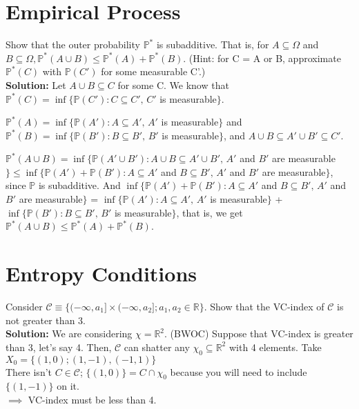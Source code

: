 \documentclass[11pt,letterpaper]{article}                  %
\begin{document}
\section{Empirical Process}

\begin{problem} Show that the outer probability $\mathbb{P}^*$ is subadditive. That is, for $A \subseteq \Omega$ and $B \subseteq \Omega, \mathbb{P}^*(A \cup B) \leq \mathbb{P}^*(A) + \mathbb{P}^*(B)$. (Hint: for C = A or B, approximate $\mathbb{P}^*(C)$ with $\mathbb{P}(C')$ for some measurable C'.) \\
	
	\textbf{Solution:}  Let $A \cup B \subseteq C$ for some C. We know that $\mathbb{P}^*(C) = \inf \{\mathbb{P}(C'): C \subseteq C', \, C'$ is measurable$\}$. 
	
	$\mathbb{P}^*(A) = \inf \{\mathbb{P}(A'): A \subseteq A', \, A'$ is measurable$\}$ and $\mathbb{P}^*(B) = \inf \{\mathbb{P}(B'): B \subseteq B', \, B'$ is measurable$\}$, and $A \cup B \subseteq A' \cup B' \subseteq C'$. 
	
	$\mathbb{P}^*(A \cup B) = \inf \{\mathbb{P}(A' \cup B'): A \cup B \subseteq A' \cup B', \, A'$ and $B'$ are measurable$\} \leq \inf \{\mathbb{P}(A') +  \mathbb{P}(B'): A \subseteq A'$ and $B \subseteq B', \, A'$ and $B'$ are measurable$\}$, since $\mathbb{P}$ is subadditive. And $\inf \{\mathbb{P}(A') +  \mathbb{P}(B'): A \subseteq A'$ and $B \subseteq B', \, A'$ and $B'$ are measurable$\}$ = $\inf \{\mathbb{P}(A'): A \subseteq A', \, A'$ is measurable$\}$ + $\inf \{\mathbb{P}(B'): B \subseteq B', \, B'$ is measurable$\}$, that is, we get $\mathbb{P}^*(A \cup B) \leq \mathbb{P}^*(A) + \mathbb{P}^*(B)$.
\end{problem}

\bigskip
\begin{problem}

\end{problem}

\bigskip
\section{Entropy Conditions}

\begin{problem} Consider $\mathcal{C}\equiv \{(-\infty, a_1] \times (-\infty, a_2]; a_1,a_2 \in \mathbb{R}\}$. Show that the VC-index of $\mathcal{C}$ is not greater than 3.\\

\textbf{Solution:} We are considering $\chi = \mathbb{R}^2$. (BWOC) Suppose that VC-index is greater than 3, let's say 4. Then, $\mathcal{C}$ can shatter any $\chi_0 \subseteq \mathbb{R}^2$ with 4 elements. Take $X_0 = \{(1,0); (1,-1), (-1,1)\}$\\

There isn't $C \in \mathcal{C}$; $\{(1,0)\} = C \cap \chi_0$ because you will need to include $\{(1,-1)\}$ on it.\\

$\implies$ VC-index must be less than 4.
\end{problem}
\end{document}
